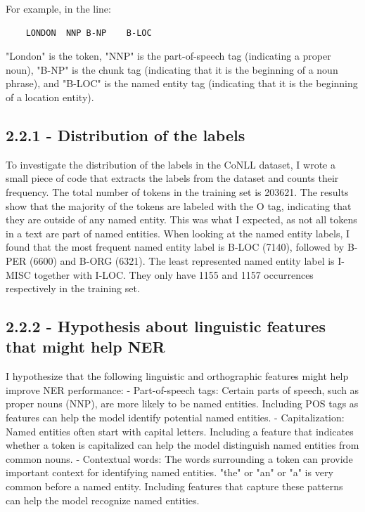 \documentclass[11pt]{article}
\begin{document}
For example, in the line:
\begin{verbatim}
    LONDON	NNP	B-NP	B-LOC
\end{verbatim}
"London" is the token, "NNP" is the part-of-speech tag (indicating a proper noun), "B-NP" is the chunk tag (indicating that it is the beginning of a noun phrase), and "B-LOC" is the named entity tag (indicating that it is the beginning of a location entity).

\subsection*{2.2.1 - Distribution of the labels}
To investigate the distribution of the labels in the CoNLL dataset, I wrote a small piece of code that extracts the labels from the dataset and counts their frequency.
The total number of tokens in the training set is 203621.
The results show that the majority of the tokens are labeled with the O tag, indicating that they are outside of any named entity.
This was what I expected, as not all tokens in a text are part of named entities.
When looking at the named entity labels, I found that the most frequent named entity label is B-LOC (7140), followed by B-PER (6600) and B-ORG (6321).
The least represented named entity label is I-MISC together with I-LOC. They only have 1155 and 1157 occurrences respectively in the training set.


\subsection*{2.2.2 - Hypothesis about linguistic features that might help NER}\label{sec:linguistic_features}
I hypothesize that the following linguistic and orthographic features might help improve NER performance:
- Part-of-speech tags: Certain parts of speech, such as proper nouns (NNP), are more likely to be named entities. Including POS tags as features can help the model identify potential named entities.
- Capitalization: Named entities often start with capital letters. Including a feature that indicates whether a token is capitalized can help the model distinguish named entities from common nouns.
- Contextual words: The words surrounding a token can provide important context for identifying named entities. "the" or "an" or "a" is very common before a named entity.
Including features that capture these patterns can help the model recognize named entities.
\end{document}
